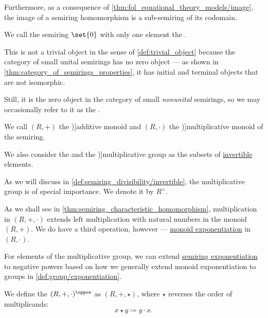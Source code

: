\begin{definition}
\begin{thmenum}
    Furthermore, as a consequence of \cref{thm:fol_equational_theory_models/image}, the image of a semiring homomorphism is a sub-semiring of its codomain.

     We call the semiring \( \set{ 0 } \) with only one element the .

    This is not a trivial object in the sense of \cref{def:trivial_object} because the category of small unital semirings has no zero object --- as shown in \cref{thm:category_of_semirings_properties}, it has initial and terminal objects that are not isomorphic.

    Still, it is the zero object in the category of small \emph{nonunital} semirings, so we may occasionally refer to it as the .

    \mimprovised We call \( (R, +) \) the \term[ru=аддитивный моноид (\cite[176]{БелоусовТкачёв2004ДискретнаяМатематика})]{additive monoid} and \( (R, \cdot) \) the \term[ru=мультипликативный моноид (\cite[176]{БелоусовТкачёв2004ДискретнаяМатематика})]{multiplicative monoid} of the semiring.

    We also consider the  and the \term[en=multiplicative group (\cite[97]{Bourbaki1998Algebra1to3})]{multiplicative group} as the subsets of \hyperref[def:monoid_inverse]{invertible} elements.

    As we will discuss in \cref{def:semiring_divisibility/invertible}, the multiplicative group is of special importance. We denote it by \( R^\times \).

     As we shall see in \cref{thm:semiring_characteristic_homomorphism}, multiplication in \( (R, +, \cdot) \) extends left multiplication with natural numbers in the monoid \( (R, +) \). We do have a third operation, however --- \hyperref[def:monoid/exponentiation]{monoid exponentiation} in \( (R, \cdot) \).

    For elements of the multiplicative group, we can extend \hyperref[def:semiring/exponentiation]{semiring exponentiation} to negative powers based on how we generally extend monoid exponentiation to groups in \cref{def:group/exponentiation}.

     We define the  \( (R, +, \cdot)^\oppos \) as \( (R, +, \star) \), where \( {\star} \) reverses the order of multiplicands:
    \begin{equation*}
      x \star y \coloneqq y \cdot x.
    \end{equation*}


\end{thmenum}
\end{definition}
